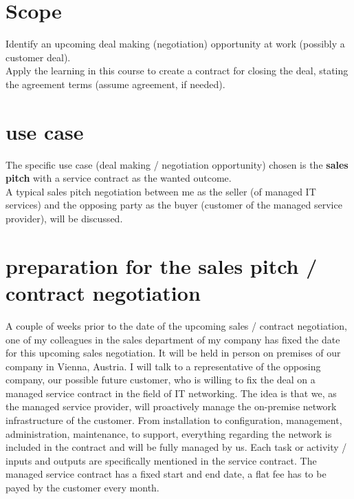 \chapter{Scope}

Identify an upcoming deal making (negotiation) opportunity at work (possibly a customer deal). \\

\noindent Apply the learning in this course to create a contract for closing the deal, stating the agreement terms (assume agreement, if needed).

\chapter{use case}

The specific use case (deal making / negotiation opportunity) chosen is the \textbf{sales pitch}
with a service contract as the wanted outcome. \\

\noindent A typical sales pitch negotiation between me as the seller (of managed IT services) and 
the opposing party as the buyer (customer of the managed service provider), will be discussed. \\
 
\chapter{preparation for the sales pitch / contract negotiation}

A couple of weeks prior to the date of the upcoming sales / contract negotiation,
one of my colleagues in the sales department of my company has fixed the date
for this upcoming sales negotiation. It will be held in person on premises of
our company in Vienna, Austria. I will talk to a representative of the opposing company,
our possible future customer, who is willing to fix the deal on a 
managed service contract in the field of IT networking. The idea is that
we, as the managed service provider, will proactively manage the on-premise
network infrastructure of the customer. From installation to configuration,
management, administration, maintenance, to support, everything regarding the network
is included in the contract and will be fully managed by us. 
Each task or activity / inputs and outputs are specifically mentioned in the service contract.
The managed service contract has a fixed start and end date, a flat fee has to be payed by the customer
every month. \\

